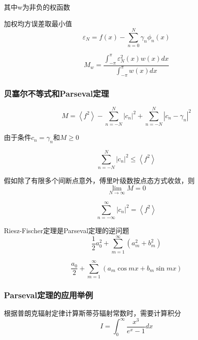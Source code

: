 \documentclass{beamer}
\begin{document}
\begin{CJK}{UTF8}{song}
\begin{frame}[allowframebreaks]
其中w为非负的权函数

加权均方误差取最小值
\begin{equation}
\varepsilon_{N}=f(x)-\sum_{n=0}^{N} \gamma_{n} \phi_{n}(x)
\end{equation}

\begin{equation}
M_{w}=\frac{\int_{-\pi}^{\pi} \varepsilon_{N}^{2}(x) w(x) d x}{\int_{-\pi}^{\pi} w(x) d x}
\end{equation}
\end{frame}

\begin{frame}[allowframebreaks]
\frametitle{贝塞尔不等式和Parseval定理}

\begin{equation}
M=\left\langle f^{2}\right\rangle-\sum_{n=-N}^{N}\left|c_{n}\right|^{2}+\sum_{n=-N}^{N}\left|c_{n}-\gamma_{n}\right|^{2}
\end{equation}

由于条件$c_{n}=\gamma_{n}$和$M \geq 0$

\begin{equation}
\sum_{n=-N}^{N}\left|c_{n}\right|^{2} \leq\left\langle f^{2}\right\rangle
\end{equation}

假如除了有限多个间断点意外，傅里叶级数按点态方式收敛，则
\begin{equation}
\lim _{N \rightarrow \infty} M=0
\end{equation}

\begin{equation}
\sum_{n=-\infty}^{\infty}\left|c_{n}\right|^{2}=\left\langle f^{2}\right\rangle
\end{equation}

Riesz-Fischer定理是Parseval定理的逆问题
\begin{equation}
\frac{1}{2} a_{0}^{2}+\sum_{m=1}^{\infty}\left(a_{m}^{2}+b_{m}^{2}\right)
\end{equation}

\begin{equation}
\frac{a_{0}}{2}+\sum_{m=1}^{\infty}\left(a_{m} \cos m x+b_{m} \sin m x\right)
\end{equation}

\end{frame}

\begin{frame}[allowframebreaks]
\frametitle{Parseval定理的应用举例}

根据普朗克辐射定律计算斯蒂芬辐射常数时，需要计算积分
\begin{equation}
I=\int_{0}^{\infty} \frac{x^{3}}{e^{x}-1} d x
\end{equation}


\end{frame}
\end{CJK}
\end{document}
